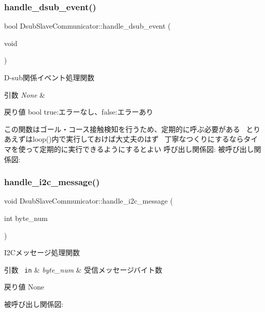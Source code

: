 \subsubsection{\texorpdfstring{handle\_dsub\_event()}{handle\_dsub\_event()}}
{\footnotesize\ttfamily bool Dsub\+Slave\+Communicator\+::handle\+\_\+dsub\+\_\+event (\begin{DoxyParamCaption}\item[{void}]{ }\end{DoxyParamCaption})}



D-\/sub関係イベント処理関数 


\begin{DoxyParams}{引数}
{\em None} & \\
\hline
\end{DoxyParams}
\begin{DoxyReturn}{戻り値}
bool true\+:エラーなし、false\+:エラーあり
\end{DoxyReturn}
この関数はゴール・コース接触検知を行うため、定期的に呼ぶ必要がある~\newline
とりあえずはloop()内で実行しておけば大丈夫のはず~\newline
丁寧なつくりにするならタイマを使って定期的に実行できるようにするとよい 呼び出し関係図\+:
被呼び出し関係図\+:
\mbox{\label{class_dsub_slave_communicator_ad2b7d6a48942a55bea5f095da31eb683}} 
\subsubsection{\texorpdfstring{handle\_i2c\_message()}{handle\_i2c\_message()}}
{\footnotesize\ttfamily void Dsub\+Slave\+Communicator\+::handle\+\_\+i2c\+\_\+message (\begin{DoxyParamCaption}\item[{int}]{byte\+\_\+num }\end{DoxyParamCaption})\hspace{0.3cm}{\ttfamily [static]}}



I2\+Cメッセージ処理関数 


\begin{DoxyParams}[1]{引数}
\mbox{\texttt{ in}}  & {\em byte\+\_\+num} & 受信メッセージバイト数 \\
\hline
\end{DoxyParams}
\begin{DoxyReturn}{戻り値}
None 
\end{DoxyReturn}
被呼び出し関係図\+:
\mbox{\label{class_dsub_slave_communicator_a7a7d6e43b95833e698761442b0741e72}} 
